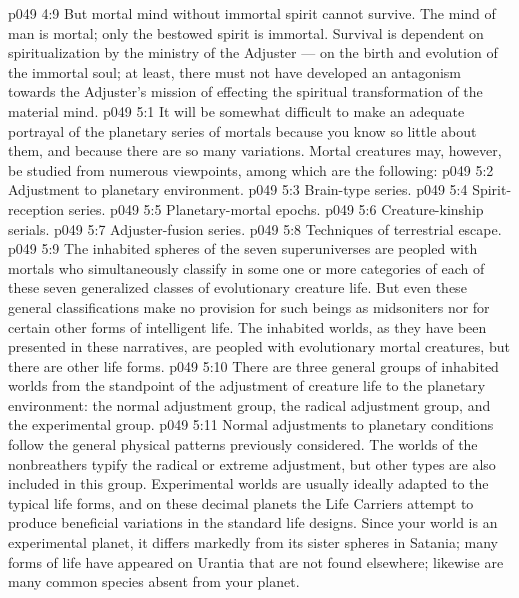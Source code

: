 \vs p049 4:9 But mortal mind without immortal spirit cannot survive. The mind of man is mortal; only the bestowed spirit is immortal. Survival is dependent on spiritualization by the ministry of the Adjuster --- on the birth and evolution of the immortal soul; at least, there must not have developed an antagonism towards the Adjuster’s mission of effecting the spiritual transformation of the material mind.
\vs p049 5:1 It will be somewhat difficult to make an adequate portrayal of the planetary series of mortals because you know so little about them, and because there are so many variations. Mortal creatures may, however, be studied from numerous viewpoints, among which are the following:
\vs p049 5:2 \bibnobreakspace Adjustment to planetary environment.
\vs p049 5:3 \bibnobreakspace Brain\hyp{}type series.
\vs p049 5:4 \bibnobreakspace Spirit\hyp{}reception series.
\vs p049 5:5 \bibnobreakspace Planetary\hyp{}mortal epochs.
\vs p049 5:6 \bibnobreakspace Creature\hyp{}kinship serials.
\vs p049 5:7 \bibnobreakspace Adjuster\hyp{}fusion series.
\vs p049 5:8 \bibnobreakspace Techniques of terrestrial escape.
\vs p049 5:9 \pc The inhabited spheres of the seven superuniverses are peopled with mortals who simultaneously classify in some one or more categories of each of these seven generalized classes of evolutionary creature life. But even these general classifications make no provision for such beings as midsoniters nor for certain other forms of intelligent life. The inhabited worlds, as they have been presented in these narratives, are peopled with evolutionary mortal creatures, but there are other life forms.
\vs p049 5:10 \bibnobreakspace {} There are three general groups of inhabited worlds from the standpoint of the adjustment of creature life to the planetary environment: the normal adjustment group, the radical adjustment group, and the experimental group.
\vs p049 5:11 Normal adjustments to planetary conditions follow the general physical patterns previously considered. The worlds of the nonbreathers typify the radical or extreme adjustment, but other types are also included in this group. Experimental worlds are usually ideally adapted to the typical life forms, and on these decimal planets the Life Carriers attempt to produce beneficial variations in the standard life designs. Since your world is an experimental planet, it differs markedly from its sister spheres in Satania; many forms of life have appeared on Urantia that are not found elsewhere; likewise are many common species absent from your planet.
